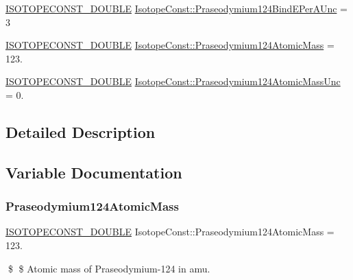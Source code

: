 \begin{DoxyCompactItemize}
\item 
\mbox{\hyperlink{group___isotope_const-_macros_ga8f45a7272ce02c0b4c65c44636ed719a}{I\+S\+O\+T\+O\+P\+E\+C\+O\+N\+S\+T\+\_\+\+D\+O\+U\+B\+LE}} \mbox{\hyperlink{group___isotope_const-_praseodymium-_pr124_gaa71ce4d34501d1c41e20c84b5367cfe1}{Isotope\+Const\+::\+Praseodymium124\+Bind\+E\+Per\+A\+Unc}} = 3
\item 
\mbox{\hyperlink{group___isotope_const-_macros_ga8f45a7272ce02c0b4c65c44636ed719a}{I\+S\+O\+T\+O\+P\+E\+C\+O\+N\+S\+T\+\_\+\+D\+O\+U\+B\+LE}} \mbox{\hyperlink{group___isotope_const-_praseodymium-_pr124_ga8a94de1f638cf90ac74526ae234f43b6}{Isotope\+Const\+::\+Praseodymium124\+Atomic\+Mass}} = 123.
\item 
\mbox{\hyperlink{group___isotope_const-_macros_ga8f45a7272ce02c0b4c65c44636ed719a}{I\+S\+O\+T\+O\+P\+E\+C\+O\+N\+S\+T\+\_\+\+D\+O\+U\+B\+LE}} \mbox{\hyperlink{group___isotope_const-_praseodymium-_pr124_ga5394c3d242246b72cb410dd2dfd99e0d}{Isotope\+Const\+::\+Praseodymium124\+Atomic\+Mass\+Unc}} = 0.
\end{DoxyCompactItemize}


\subsection{Detailed Description}


\subsection{Variable Documentation}
\mbox{\label{group___isotope_const-_praseodymium-_pr124_ga8a94de1f638cf90ac74526ae234f43b6}} 
\subsubsection{\texorpdfstring{Praseodymium124\+Atomic\+Mass}{Praseodymium124AtomicMass}}
{\footnotesize\ttfamily \mbox{\hyperlink{group___isotope_const-_macros_ga8f45a7272ce02c0b4c65c44636ed719a}{I\+S\+O\+T\+O\+P\+E\+C\+O\+N\+S\+T\+\_\+\+D\+O\+U\+B\+LE}} Isotope\+Const\+::\+Praseodymium124\+Atomic\+Mass = 123.}

\$ \$ Atomic mass of Praseodymium-\/124 in amu. \mbox{\label{group___isotope_const-_praseodymium-_pr124_ga5394c3d242246b72cb410dd2dfd99e0d}} 

